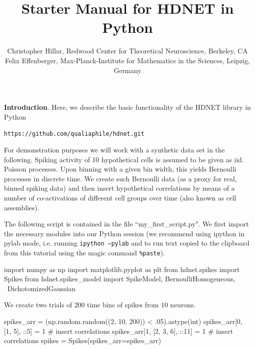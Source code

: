 \documentclass[letter, 12pt]{article}
\theoremstyle{definition}
\theoremstyle{remark}
\begin{document}
\title{Starter Manual for HDNET in Python}
\author{\normalsize Christopher Hillar, Redwood Center for Theoretical Neuroscience, Berkeley, CA\\
\normalsize Felix Effenberger, Max-Planck-Institute for Mathematics in the Sciences, Leipzig, Germany
}
\date{}



\maketitle

\textbf{Introduction}.  Here, we describe the basic functionality of the HDNET library in Python

\begin{center}
\texttt{https://github.com/qualiaphile/hdnet.git} \\
\end{center}

For demonstration purposes we will work with a synthetic data set in the following. Spiking activity of 10 hypothetical cells is assumed to be given as iid. Poisson processes. Upon binning with a given bin width, this yields Bernoulli processes in discrete time. We create such Bernoulli data (as a proxy for real, binned spiking data) and then insert hypothetical correlations by means of a number of co-activations of different cell groups over time (also known as cell assemblies).

The following script is contained in the file ``my\_first\_script.py".  We first import the necessary modules into our Python session (we recommend using ipython in pylab mode, i.e. running \texttt{ipython --pylab} and to run text copied to the clipboard from this tutorial using the magic command \texttt{\%paste}).

\begin{python}
import numpy as np
import matplotlib.pyplot as plt
from hdnet.spikes import Spikes
from hdnet.spikes_model import SpikeModel, BernoulliHomogeneous, \
	DichotomizedGaussian
\end{python}

We create two trials of $200$ time bins of spikes from $10$ neurons.

\begin{python}
spikes_arr = (np.random.random((2, 10, 200)) < .05).astype(int)
spikes_arr[0, [1, 5], ::5] = 1 # insert correlations
spikes_arr[1, [2, 3, 6], ::11] = 1  # insert correlations
spikes = Spikes(spikes_arr=spikes_arr)
\end{python}
\end{document}

